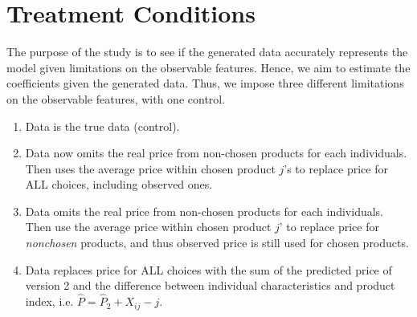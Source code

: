 \documentclass[12pt]{article}
\begin{document}
\section{Treatment Conditions}
The purpose of the study is to see if the generated data accurately represents the model given limitations on the observable features. Hence, we aim to estimate the coefficients given the generated data. Thus, we impose three different limitations on the observable features, with one control.
\begin{enumerate}
	\item Data is the true data (control).
	\item Data now omits the real price from non-chosen products for each individuals. Then uses the average price within chosen product \(j\)'s to replace price for ALL choices, including observed ones.
	\item Data omits the real price from non-chosen products for each individuals. Then use the average price within chosen product \(j\)' to replace price for \textit{nonchosen} products, and thus observed price is still used for chosen products.
	\item Data replaces price for ALL choices with the sum of the predicted price of version 2 and the difference between individual characteristics and product index, i.e. \(\hat{P}=\hat{P}_2+X_{ij}-j\).
\end{enumerate}
\newpage
\end{document}
